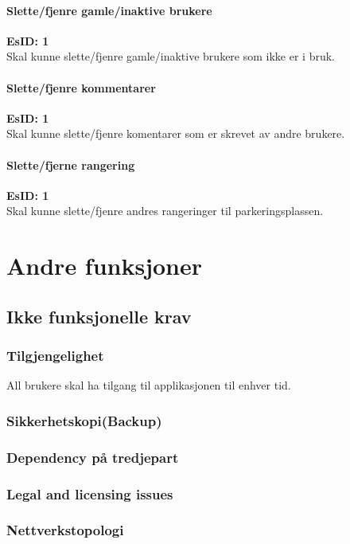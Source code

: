 \documentclass[12pt]{article}
\newcommand{\EsID}[1]{\textbf{EsID: #1}\\}
\begin{document}
            \paragraph{Slette/fjenre gamle/inaktive brukere}
            \EsID{1}Skal kunne slette/fjenre gamle/inaktive brukere som ikke er i bruk.

            \paragraph{Slette/fjenre kommentarer}
            \EsID{1}Skal kunne slette/fjenre komentarer som er skrevet av andre brukere.

            \paragraph{Slette/fjerne rangering}
            \EsID{1}Skal kunne slette/fjenre andres rangeringer til parkeringsplassen.

           
\section{Andre funksjoner}
    \subsection{Ikke funksjonelle krav}

        \subsubsection{Tilgjengelighet}
        All brukere skal ha tilgang til applikasjonen til enhver tid.
        
        \subsubsection{Sikkerhetskopi(Backup)}


        \subsubsection{Dependency på tredjepart}


        \subsubsection{Legal and licensing issues}


        \subsubsection{Nettverkstopologi}
\end{document}
